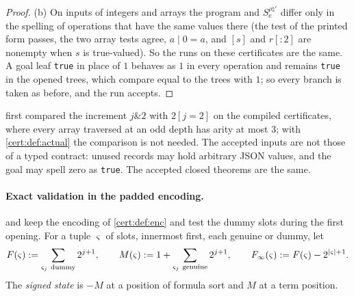 \begin{proof}
(b) On inputs of integers and arrays the program and $S^{\rho\natural\prime}_{\mathrm e}$
differ only in the spelling of operations that have the same values there (the test of
the printed form passes, the two array tests agree, $a\mathbin{|}0=a$, and $[s]$ and
$r[{:}2]$ are nonempty when $s$ is true-valued). So the runs on these certificates are
the same. A goal leaf \texttt{true} in place of $1$ behaves as $1$ in every operation and
remains \texttt{true} in the opened trees, which compare equal to the trees with $1$; so
every branch is taken as before, and the run accepts.
\end{proof}

 first compared the increment $j\mathbin{\&}2$ with $2[j=2]$ on
the compiled certificates, where every array traversed at an odd depth has arity at most
$3$; with \cref{cert:def:actual} the comparison is not needed. The accepted inputs are
not those of a typed contract: unused records may hold arbitrary JSON values, and the
goal may spell zero as \texttt{true}. The accepted closed theorems are the same.

\paragraph{Exact validation in the padded encoding.}  and
 keep the encoding of \cref{cert:def:enc} and test the dummy slots
during the first opening. For a tuple $\varsigma$ of slots, innermost first, each genuine
or dummy, let
\[
F(\varsigma)\defeq\sum_{\varsigma_j\ \text{dummy}}2^{j+1},\qquad
M(\varsigma)\defeq 1+\sum_{\varsigma_j\ \text{genuine}}2^{j+1},\qquad
F_{\infty}(\varsigma)\defeq F(\varsigma)-2^{\lvert\varsigma\rvert+1}.
\]
The \emph{signed state} is $-M$ at a position of formula sort and $M$ at a term position.


